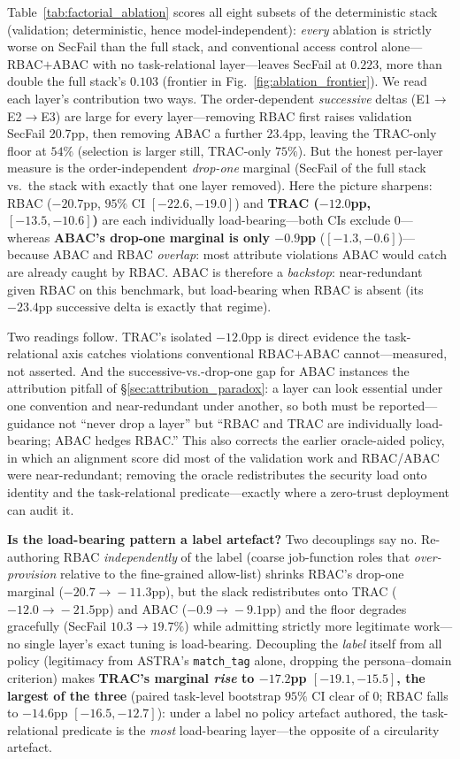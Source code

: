 \documentclass[sigconf,review,anonymous]{acmart}
\begin{document}
Table~\ref{tab:factorial_ablation} scores all eight subsets of the deterministic stack (validation; deterministic, hence model-independent): \emph{every} ablation is strictly worse on SecFail than the full stack, and conventional access control alone---RBAC$+$ABAC with no task-relational layer---leaves SecFail at $0.223$, more than double the full stack's $0.103$ (frontier in Fig.~\ref{fig:ablation_frontier}). We read each layer's contribution two ways. The order-dependent \emph{successive} deltas (E1$\to$E2$\to$E3) are large for every layer---removing RBAC first raises validation SecFail $20.7$pp, then removing ABAC a further $23.4$pp, leaving the TRAC-only floor at $54\%$ (selection is larger still, TRAC-only $75\%$). But the honest per-layer measure is the order-independent \emph{drop-one} marginal (SecFail of the full stack vs.\ the stack with exactly that one layer removed). Here the picture sharpens: RBAC ($-20.7$pp, $95\%$ CI $[-22.6,-19.0]$) and \textbf{TRAC ($-12.0$pp, $[-13.5,-10.6]$)} are each individually load-bearing---both CIs exclude $0$---whereas \textbf{ABAC's drop-one marginal is only $-0.9$pp} ($[-1.3,-0.6]$)---because ABAC and RBAC \emph{overlap}: most attribute violations ABAC would catch are already caught by RBAC. ABAC is therefore a \emph{backstop}: near-redundant given RBAC on this benchmark, but load-bearing when RBAC is absent (its $-23.4$pp successive delta is exactly that regime).

Two readings follow. TRAC's isolated $-12.0$pp is direct evidence the task-relational axis catches violations conventional RBAC$+$ABAC cannot---measured, not asserted. And the successive-vs.-drop-one gap for ABAC instances the attribution pitfall of \S\ref{sec:attribution_paradox}: a layer can look essential under one convention and near-redundant under another, so both must be reported---guidance not ``never drop a layer'' but ``RBAC and TRAC are individually load-bearing; ABAC hedges RBAC.'' This also corrects the earlier oracle-aided policy, in which an alignment score did most of the validation work and RBAC/ABAC were near-redundant; removing the oracle redistributes the security load onto identity and the task-relational predicate---exactly where a zero-trust deployment can audit it.

\textbf{Is the load-bearing pattern a label artefact?} Two decouplings say no. Re-authoring RBAC \emph{independently} of the label (coarse job-function roles that \emph{over-provision} relative to the fine-grained allow-list) shrinks RBAC's drop-one marginal ($-20.7\!\to\!-11.3$pp), but the slack redistributes onto TRAC ($-12.0\!\to\!-21.5$pp) and ABAC ($-0.9\!\to\!-9.1$pp) and the floor degrades gracefully (SecFail $10.3\!\to\!19.7\%$) while admitting strictly more legitimate work---no single layer's exact tuning is load-bearing. Decoupling the \emph{label} itself from all policy (legitimacy from ASTRA's \texttt{match\_tag} alone, dropping the persona--domain criterion) makes \textbf{TRAC's marginal \emph{rise} to $-17.2$pp $[-19.1,-15.5]$, the largest of the three} (paired task-level bootstrap $95\%$ CI clear of $0$; RBAC falls to $-14.6$pp $[-16.5,-12.7]$): under a label no policy artefact authored, the task-relational predicate is the \emph{most} load-bearing layer---the opposite of a circularity artefact.
\end{document}
